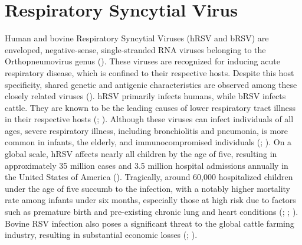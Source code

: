 \section{Respiratory Syncytial Virus} \label{sec:Respiratory Syncytial Virus}
Human and bovine Respiratory Syncytial Viruses (hRSV and bRSV) are enveloped, negative-sense, single-stranded RNA viruses belonging to the Orthopneumovirus genus (\cite{Afonso2016Taxonomy2016}). These viruses are recognized for inducing acute respiratory disease, which is confined to their respective hosts. Despite this host specificity, shared genetic and antigenic characteristics are observed among these closely related viruses (\cite{Buchholz2000ChimericVaccine}). hRSV primarily infects humans, while bRSV infects cattle. They are known to be the leading causes of lower respiratory tract illness in their respective hosts (\cite{Nair2013GlobalAnalysis}; \cite{Sacco2014RespiratoryCattle}). Although these viruses can infect individuals of all ages, severe respiratory illness, including bronchiolitis and pneumonia, is more common in infants, the elderly, and immunocompromised individuals (\cite{Falsey2005RespiratoryAdults}; \cite{Coultas2019RespiratoryAge}). On a global scale, hRSV affects nearly all children by the age of five, resulting in approximately 35 million cases and 3.5 million hospital admissions annually in the United States of America (\cite{Shi2017GlobalStudy}). Tragically, around 60,000 hospitalized children under the age of five succumb to the infection, with a notably higher mortality rate among infants under six months, especially those at high risk due to factors such as premature birth and pre-existing chronic lung and heart conditions (\cite{Shi2017GlobalStudy}; \cite{Jha2016RespiratoryVirus}; \cite{Coultas2019RespiratoryAge}). Bovine RSV infection also poses a significant threat to the global cattle farming industry, resulting in substantial economic losses (\cite{Brodersen2010BovineVirus}; \cite{Valarcher2007BovineInfection}).


